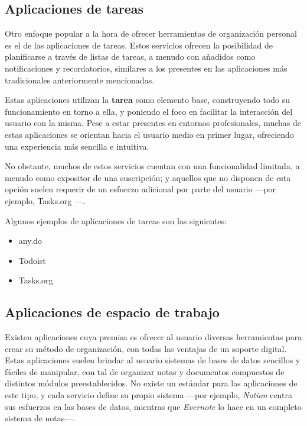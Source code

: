 \documentclass[10pt, a4paper]{aqademic}
\begin{document}
\subsection*{Aplicaciones de tareas}

Otro enfoque popular a la hora de ofrecer herramientas de organización personal es el de las aplicaciones de tareas. Estos servicios ofrecen la posibilidad de planificarse a través de listas de tareas, a menudo con añadidos como notificaciones y recordatorios, similares a los presentes en las aplicaciones más tradicionales anteriormente mencionadas. 

\medskip

Estas aplicaciones utilizan la \textbf{tarea} como elemento base, construyendo todo su funcionamiento en torno a ella, y poniendo el foco en facilitar la interacción del usuario con la misma. Pese a estar presentes en entornos profesionales, muchas de estas aplicaciones se orientan hacia el usuario medio en primer lugar, ofreciendo una experiencia más sencilla e intuitiva.

\medskip

No obstante, muchos de estos servicios cuentan con una funcionalidad limitada, a menudo como expositor de una suscripción; y aquellos que no disponen de esta opción suelen requerir de un esfuerzo adicional por parte del usuario ---por ejemplo, Tasks.org \cite{tasks.org}---.

\medskip

Algunos ejemplos de aplicaciones de tareas son las siguientes:

\begin{itemize}
	\item any.do
	\item Todoist
	\item Tasks.org
\end{itemize}


\subsection*{Aplicaciones de espacio de trabajo}

Existen aplicaciones cuya premisa es ofrecer al usuario diversas herramientas para crear su método de organización, con todas las ventajas de un soporte digital. Estas aplicaciones suelen brindar al usuario sistemas de bases de datos sencillos y fáciles de manipular, con tal de organizar notas y documentos compuestos de distintos módulos preestablecidos. No existe un estándar para las aplicaciones de este tipo, y cada servicio define su propio sistema ---por ejemplo, \textit{Notion} centra sus esfuerzos en las bases de datos, mientras que \textit{Evernote} lo hace en un completo sistema de notas---.
\end{document}
